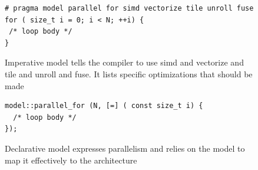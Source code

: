 \begin{figure}
\begin{Verbatim}[frame=leftline]
# pragma model parallel for simd vectorize tile unroll fuse
for ( size_t i = 0; i < N; ++i) {
 /* loop body */
}
\end{Verbatim}
\caption{Imperative model tells the compiler to use simd and vectorize and tile and unroll and fuse. It lists specific optimizations that should be made}
\label{figOMPLike}
\end{figure}

\begin{figure}
\begin{Verbatim}[frame=leftline]
model::parallel_for (N, [=] ( const size_t i) {
  /* loop body */
});
\end{Verbatim}
\caption{Declarative model expresses parallelism and relies on the model to map it effectively to the architecture}
\label{figKokkosLike}
\end{figure}
